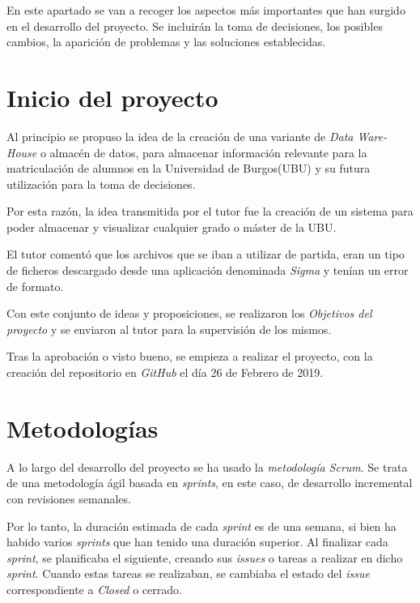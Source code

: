 
En este apartado se van a recoger los aspectos más importantes que han surgido en el desarrollo del proyecto. Se incluirán la toma de decisiones, los posibles cambios, la aparición de problemas y las soluciones establecidas.

\section{Inicio del proyecto}\label{inicio_del_proyecto}

Al principio se propuso la idea de la creación de una variante de \emph{Data Ware-House} o almacén de datos, para almacenar información relevante para la matriculación de alumnos en la Universidad de Burgos(UBU) y su futura utilización para la toma de decisiones.

Por esta razón, la idea transmitida por el tutor fue la creación de un sistema para poder almacenar y visualizar cualquier grado o máster de la UBU.

El tutor comentó que los archivos que se iban a utilizar de partida, eran un tipo de ficheros descargado desde una aplicación denominada \emph{Sigma} y tenían un error de formato.

Con este conjunto de ideas y proposiciones, se realizaron los \emph{Objetivos del proyecto} y se enviaron al tutor para la supervisión de los mismos.

Tras la aprobación o visto bueno, se empieza a realizar el proyecto, con la creación del repositorio en \emph{GitHub} el día 26 de Febrero de 2019.



 
\section{Metodologías}\label{metodologias}

A lo largo del desarrollo del proyecto se ha usado la \emph{metodología Scrum}. Se trata de una metodología ágil basada en \emph{sprints}, en este caso, de desarrollo incremental con revisiones semanales.

Por lo tanto, la duración estimada de cada \emph{sprint} es de una semana, si bien ha habido varios \emph{sprints} que han tenido una duración superior. Al finalizar cada \emph{sprint}, se planificaba el siguiente, creando sus \emph{issues} o tareas a realizar en dicho \emph{sprint}. Cuando estas tareas se realizaban, se cambiaba el estado del \emph{issue} correspondiente a \emph{Closed} o cerrado.  


